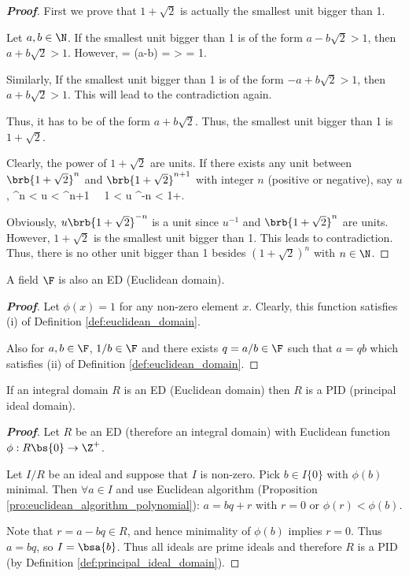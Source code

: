 \begin{proof}[\bf Proof]
First we prove that $1+\sqrt{2}$ is actually the smallest unit bigger than 1.

Let $a,b\in \N$. If the smallest unit bigger than 1 is of the form $a-b\sqrt{2} > 1$, then $a+b\sqrt{2} > 1$. However,
 = \phi(a-b) =  >  = 1. 
\ee

Similarly, If the smallest unit bigger than 1 is of the form $-a+b\sqrt{2} > 1$, then $a+b\sqrt{2} > 1$. This will lead to the contradiction again.

Thus, it has to be of the form  $a+b\sqrt{2}$. Thus, the smallest unit bigger than 1 is $1+\sqrt{2}$.

Clearly, the power of $1+\sqrt{2}$ are units. If there exists any unit between $\brb{1+\sqrt{2}}^n$ and $\brb{1+\sqrt{2}}^{n+1}$ with integer $n$ (positive or negative), say $u$,
\be
{}^n < u < ^{n+1} \ \ra \ 1 < u ^{-n} < 1+.
\ee

Obviously, $u \brb{1+\sqrt{2}}^{-n}$ is a unit since $u^{-1}$ and $\brb{1+\sqrt{2}}^{n}$ are units. However, $1+\sqrt{2}$ is the smallest unit bigger than 1. This leads to contradiction. Thus, there is no other unit bigger than 1 besides $(1+\sqrt{2})^n$ with $n\in \N$.
\end{proof}


\begin{proposition}\label{pro:field_implies_ed}
A field $\F$ is also an ED (Euclidean domain).
\end{proposition}

\begin{proof}[\bf Proof]
Let $\phi(x) = 1$ for any non-zero element $x$. Clearly, this function satisfies (i) of Definition \ref{def:euclidean_domain}.

Also for $a,b\in \F$, $1/b\in \F$ and there exists $q = a/b \in \F$ such that $a = qb$ which satisfies (ii) of Definition \ref{def:euclidean_domain}.
\end{proof}

\begin{proposition}\label{pro:ed_implies_pid}
If an integral domain $R$ is an ED (Euclidean domain) then $R$ is a PID (principal ideal domain).
\end{proposition}

\begin{proof}[\bf Proof]%
Let $R$ be an ED (therefore an integral domain) with Euclidean function $\phi: R \bs \{0\} \to \Z^+$. %

Let $I /R$ be an ideal and suppose that $I$ is non-zero. Pick $b \in I \{0\}$ with $\phi(b)$ minimal. Then $\forall a \in I$ and use Euclidean algorithm (Proposition \ref{pro:euclidean_algorithm_polynomial}): $a = bq + r$ with $r = 0$ or $\phi(r) < \phi(b)$.

Note that $r = a - bq \in R$, and hence minimality of $\phi(b)$ implies $r = 0$. Thus $a = bq$, so $I = \bsa{b}$. Thus all ideals are prime ideals and therefore $R$ is a PID (by Definition \ref{def:principal_ideal_domain}).
\end{proof}



